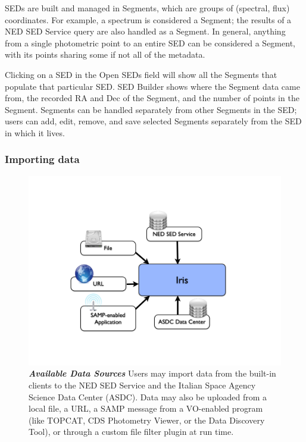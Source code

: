 \documentclass[final,5p]{elsarticle}
\begin{document}
SEDs are built and managed in Segments, which are groups of (spectral, flux) coordinates. For example, a spectrum is considered a Segment; the results of a NED SED Service query are also handled as a Segment. In general, anything from a single photometric point to an entire SED can be considered a Segment, with its points sharing some if not all of the metadata.

Clicking on a SED in the Open SEDs field will show all the Segments that populate that particular SED. SED Builder shows where the Segment data came from, the recorded RA and Dec of the Segment, and the number of points in the Segment. Segments can be handled separately from other Segments in the SED; users can add, edit, remove, and save selected Segments separately from the SED in which it lives.

\subsubsection{Importing data}

\begin{figure}
\begin{center}
\includegraphics[width=\columnwidth]{figures/IrisDiagrams.002.png}
\caption{\textit{\textbf{\label{fig:data_sources} Available Data Sources}}\textit{}\textbf{}\textit{} Users may import data from the built-in clients to the NED SED Service and the Italian Space Agency Science Data Center (ASDC). Data may also be uploaded from a local file, a URL, a SAMP message from a VO-enabled program (like TOPCAT, CDS Photometry Viewer, or the Data Discovery Tool), or through a custom file filter plugin at run time.}
\end{center}
\end{figure}
\end{document}

